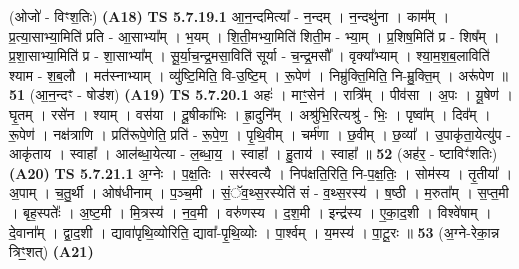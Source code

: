 \documentclass[17pt]{extarticle}
\begin{document}
                  \newline
                      (ओजो॑ - विꣳश॒तिः)  \textbf{(A18)} \newline \newline
                                \textbf{ TS 5.7.19.1} \newline
                  आ॒न॒न्दमित्या᳚ - न॒न्दम् । न॒न्दथु॑ना । काम᳚म् । प्र॒त्या॒साभ्या॒मिति॑ प्रति - आ॒साभ्या᳚म् । भ॒यम् । शि॒ती॒मभ्या॒मिति॑ शिती॒म - भ्या॒म् । प्र॒शिष॒मिति॑ प्र - शिष᳚म् । प्र॒शा॒साभ्या॒मिति॑ प्र - शा॒साभ्या᳚म् । सू॒र्या॒च॒न्द्र॒मसा॒विति॑ सूर्या - च॒न्द्र॒मसौ᳚ । वृक्या᳚भ्याम् । श्या॒म॒श॒ब॒लाविति॑ श्याम - श॒ब॒लौ । मत॑स्नाभ्याम् । व्यु॑ष्टि॒मिति॒ वि-उ॒ष्टि॒म् । रू॒पेण॑ । निम्रु॑क्ति॒मिति॒ नि-म्रु॒क्ति॒म् । अरू॑पेण ॥ \textbf{  51 } \newline
                  \newline
                      (आ॒न॒न्दꣳ - षोड॑श)  \textbf{(A19)} \newline \newline
                                \textbf{ TS 5.7.20.1} \newline
                  अहः॑ । माꣳ॒॒सेन॑ । रात्रि᳚म् । पीव॑सा । अ॒पः । यू॒षेण॑ । घृ॒तम् । रसे॑न । श्याम् । वस॑या । दू॒षीका॑भिः । ह्रा॒दुनि᳚म् । अश्रु॑भि॒रित्यश्रु॑ - भिः॒ । पृष्वा᳚म् । दिव᳚म् । रू॒पेण॑ । नक्ष॑त्राणि । प्रति॑रूपे॒णेति॒ प्रति॑ - रू॒पे॒ण॒ । पृ॒थि॒वीम् । चर्म॑णा । छ॒वीम् । छ॒व्या᳚ । उ॒पाकृ॑ता॒येत्यु॑प - आकृ॑ताय । स्वाहा᳚ । आल॑ब्धा॒येत्या - ल॒ब्धा॒य॒ । स्वाहा᳚ । हु॒ताय॑ । स्वाहा᳚ ॥ \textbf{  52 } \newline
                  \newline
                      (अह॑र॒ - ष्टाविꣳ॑शतिः)  \textbf{(A20)} \newline \newline
                                \textbf{ TS 5.7.21.1} \newline
                  अ॒ग्नेः । प॒क्ष॒तिः । सर॑स्वत्यै । निप॑क्षति॒रिति॒ नि-प॒क्ष॒तिः॒ । सोम॑स्य । तृ॒तीया᳚ । अ॒पाम् । च॒तु॒र्थी । ओष॑धीनाम् । प॒ञ्च॒मी । सं॒ॅव॒थ्स॒रस्येति॑ सं - व॒थ्स॒रस्य॑ । ष॒ष्ठी । म॒रुता᳚म् । स॒प्त॒मी । बृह॒स्पतेः᳚ । अ॒ष्ट॒मी । मि॒त्रस्य॑ । न॒व॒मी । वरु॑णस्य । द॒श॒मी । इन्द्र॑स्य । ए॒का॒द॒शी । विश्वे॑षाम् । दे॒वाना᳚म् । द्वा॒द॒शी । द्यावा॑पृथि॒व्योरिति॒ द्यावा᳚-पृ॒थि॒व्योः । पा॒र्श्वम् । य॒मस्य॑ । पा॒टू॒रः ॥ \textbf{  53 } \newline
                  \newline
                      (अ॒ग्ने-रेका॒न्न त्रिꣳ॒॒शत्)  \textbf{(A21)} \newline \newline
\end{document}
